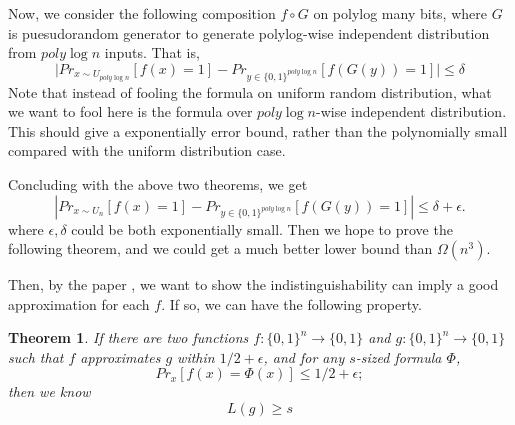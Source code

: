 \documentclass[12pt]{article}
\newtheorem{theorem}{Theorem}[section]
\renewcommand{\.}{,\ldots,}
\begin{document}
Now, we consider the following composition $f\circ G$ on polylog many bits, where $G$ is puesudorandom generator to generate polylog-wise independent distribution from $poly\log n$ inputs. That is, 
$$\big|Pr_{x\sim U_{poly\log n}}[f(x)=1]-Pr_{y\in\{0,1\}^{poly\log n}}[f(G(y))=1]\big|\leq \delta$$
Note that instead of fooling the formula on uniform random distribution, what we want to fool here is the formula over $poly\log n$-wise independent distribution. This should give a exponentially error bound, rather than the polynomially small compared with the uniform distribution case. 


Concluding with the above two theorems, we get 
$$|Pr_{x\sim U_n}[f(x)=1]-Pr_{y\in\{0,1\}^{poly\log n}}[f(G(y))=1]|\leq \delta+\epsilon.$$
where $\epsilon, \delta$ could be both exponentially small. Then we hope to prove the following theorem, and we could get a much better lower bound than $\Omega(n^3)$.

Then, by the paper \cite{trevisan2009regularity}, we want to show the indistinguishability can imply a good approximation for each $f$. If so, we can have the following property. 

\begin{theorem}
	If there are two functions $f:\{0,1\}^n\rightarrow \{0,1\}$ and $g:\{0,1\}^{ n}\rightarrow \{0,1\}$ such that $f$ approximates $g$ within $1/2+\epsilon$, and for any $s$-sized formula $\Phi$, $$Pr_x[f(x)=\Phi(x)]\leq 1/2+\epsilon;$$
	then  we know
	$$L(g)\geq s$$
\end{theorem}


%
%
%
%
\end{document}
